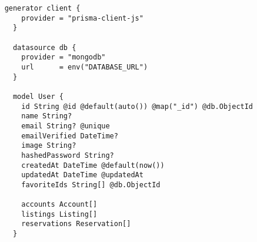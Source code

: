 \begin{verbatim}
	generator client {
		provider = "prisma-client-js"
	  }
	  
	  datasource db {
		provider = "mongodb"
		url      = env("DATABASE_URL")
	  }
	  
	  model User {
		id String @id @default(auto()) @map("_id") @db.ObjectId
		name String? 
		email String? @unique
		emailVerified DateTime?
		image String?
		hashedPassword String?
		createdAt DateTime @default(now())
		updatedAt DateTime @updatedAt
		favoriteIds String[] @db.ObjectId
		
		accounts Account[]
		listings Listing[]
		reservations Reservation[]
	  }
\end{verbatim}